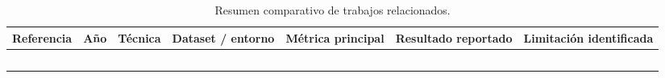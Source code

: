 %
%
%
\begin{table}[!t]
\centering
\caption{Resumen comparativo de trabajos relacionados.}
\label{tab:comparativa}
\footnotesize
\setlength{\tabcolsep}{4pt}
\begin{tabularx}{\textwidth}{@{}l c P{2.4cm} P{2.4cm} P{2.0cm} P{1.8cm} Y@{}}
\toprule
\textbf{Referencia} & \textbf{Año} & \textbf{Técnica} &
\textbf{Dataset / entorno} & \textbf{Métrica principal} &
\textbf{Resultado reportado} & \textbf{Limitación identificada}\\
\midrule
{} & \pc{} & \pc{} & \pc{} & \pc{} & \pc{} & \pc{}\\
 & \pc{} & \pc{} & \pc{} & \pc{} & \pc{} & \pc{}\\
 & \pc{} & \pc{} & \pc{} & \pc{} & \pc{} & \pc{}\\
 & \pc{} & \pc{} & \pc{} & \pc{} & \pc{} & \pc{}\\
 & \pc{} & \pc{} & \pc{} & \pc{} & \pc{} & \pc{}\\
\bottomrule
\end{tabularx}
\end{table}